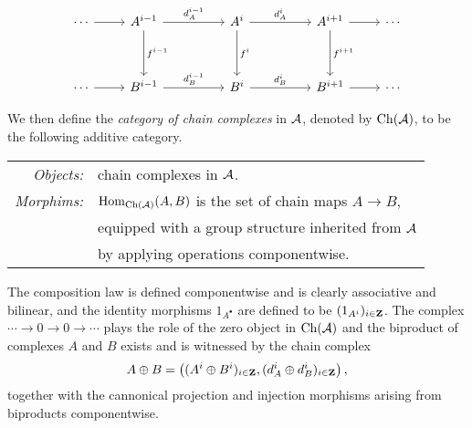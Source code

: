 \[
\begin{tikzcd}
	\cdots & {A^{i-1}} && {A^i} && {A^{i+1}} & \cdots \\
	\\
	\cdots & {B^{i-1}} && {B^i} && {B^{i+1}} & \cdots
	\arrow[from=1-1, to=1-2]
	\arrow["{d^{i-1}_A}", from=1-2, to=1-4]
	\arrow["{f^{i-1}}", from=1-2, to=3-2]
	\arrow["{d^i_A}", from=1-4, to=1-6]
	\arrow["{f^i}", from=1-4, to=3-4]
	\arrow[from=1-6, to=1-7]
	\arrow["{f^{i+1}}", from=1-6, to=3-6]
	\arrow[from=3-1, to=3-2]
	\arrow["{d^{i-1}_B}", from=3-2, to=3-4]
	\arrow["{d^{i}_B}", from=3-4, to=3-6]
	\arrow[from=3-6, to=3-7]
\end{tikzcd}
\]

We then define the \emph{category of chain complexes} in $\mathcal A$, denoted by $\operatorname{Ch}(\mathcal A)$, to be the following additive category. 
\begin{center}
    \begin{tabular}{r l}
        \textsl{Objects:} & chain complexes in $\mathcal A$. \\
        \textsl{Morphims:} & $\operatorname{Hom}_{\operatorname{Ch}(\mathcal A)}(A, B)$ is the set of chain maps $A \to B$, \\ & equipped with a group structure inherited from $\mathcal A$ \\ & by applying operations componentwise.
    \end{tabular}
\end{center}
The composition law is defined componentwise and is clearly associative and bilinear, and the identity morphisms $1_{A^\bullet}$ are defined to be $(1_{A^i})_{i \in \mathbf Z}$. The complex $\cdots \to 0 \to 0 \to \cdots$ plays the role of the zero object in $\operatorname{Ch}(\mathcal A)$ and the biproduct of complexes $A$ and $B$ exists and is witnessed by the chain complex
\[
    A \oplus B = \left( (A^i \oplus B^i)_{i \in \mathbf Z}, (d^i_A \oplus d^i_B)_{i \in \mathbf Z}\right),
\]
together with the cannonical projection and injection morphisms arising from biproducts componentwise.

